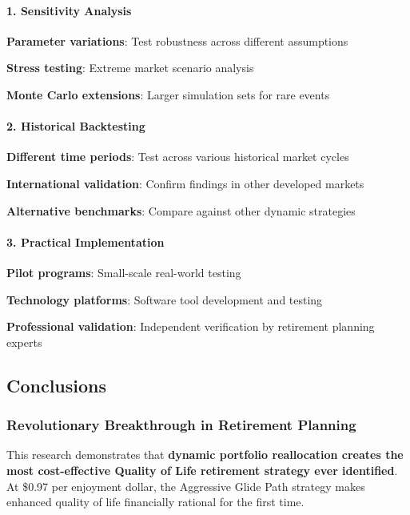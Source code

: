 \documentclass[11pt,letterpaper]{article}
\begin{document}
{{{{{{{{{{{\paragraph{1. Sensitivity Analysis}

\item \textbf{Parameter variations}: Test robustness across different assumptions
\item \textbf{Stress testing}: Extreme market scenario analysis
\item \textbf{Monte Carlo extensions}: Larger simulation sets for rare events

\paragraph{2. Historical Backtesting}

\item \textbf{Different time periods}: Test across various historical market cycles
\item \textbf{International validation}: Confirm findings in other developed markets
\item \textbf{Alternative benchmarks}: Compare against other dynamic strategies

\paragraph{3. Practical Implementation}

\item \textbf{Pilot programs}: Small-scale real-world testing
\item \textbf{Technology platforms}: Software tool development and testing
\item \textbf{Professional validation}: Independent verification by retirement planning experts



\subsection{Conclusions}


\subsubsection{Revolutionary Breakthrough in Retirement Planning}


This research demonstrates that \textbf{dynamic portfolio reallocation creates the most cost-effective Quality of Life retirement strategy ever identified}. At \$0.97 per enjoyment dollar, the Aggressive Glide Path strategy makes enhanced quality of life financially rational for the first time.


}}}}}}}}}}}
\end{document}
